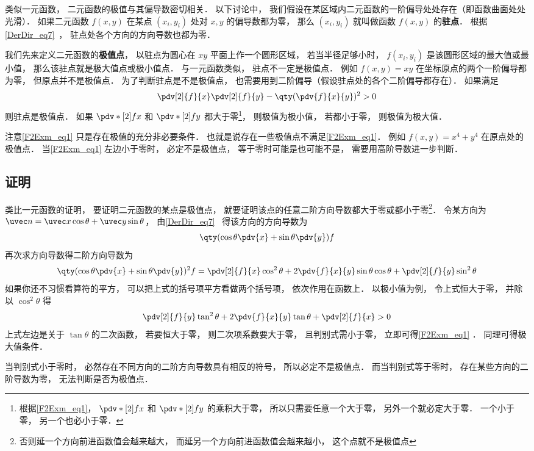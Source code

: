 
类似一元函数， 二元函数的极值与其偏导数密切相关． 以下讨论中， 我们假设在某区域内二元函数的一阶偏导处处存在（即函数曲面处处光滑）． 如果二元函数 $f(x,y)$ 在某点 $(x_i, y_i)$ 处对 $x, y$ 的偏导数都为零， 那么 $(x_i, y_i)$ 就叫做函数 $f(x,y)$ 的\textbf{驻点}． 根据\autoref{DerDir_eq7}~， 驻点处各个方向的方向导数也都为零．

我们先来定义二元函数的\textbf{极值点}， 以驻点为圆心在 $xy$ 平面上作一个圆形区域， 若当半径足够小时， $f(x_i, y_i)$ 是该圆形区域的最大值或最小值， 那么该驻点就是极大值点或极小值点． 与一元函数类似， 驻点不一定是极值点． 例如 $f(x,y) = xy$ 在坐标原点的两个一阶偏导都为零， 但原点并不是极值点． 为了判断驻点是不是极值点， 也需要用到二阶偏导（假设驻点处的各个二阶偏导都存在）． 如果满足
\begin{equation}\label{F2Exm_eq1}
\pdv[2]{f}{x}\pdv[2]{f}{y} - \qty(\pdv{f}{x}{y})^2 > 0
\end{equation}
则驻点是极值点． 如果 $\pdv*[2]{f}{x}$ 和 $\pdv*[2]{f}{y}$ 都大于零\footnote{根据\autoref{F2Exm_eq1}， $\pdv*[2]{f}{x}$ 和 $\pdv*[2]{f}{y}$ 的乘积大于零， 所以只需要任意一个大于零， 另外一个就必定大于零． 一个小于零， 另一个也必小于零．}， 则极值为极小值， 若都小于零， 则极值为极大值．

注意\autoref{F2Exm_eq1} 只是存在极值的充分非必要条件． 也就是说存在一些极值点不满足\autoref{F2Exm_eq1}． 例如 $f(x, y) = x^4 + y^4$ 在原点处的极值点． 当\autoref{F2Exm_eq1} 左边小于零时， 必定不是极值点， 等于零时可能是也可能不是， 需要用高阶导数进一步判断．

\subsection{证明}

类比一元函数的证明， 要证明二元函数的某点是极值点， 就要证明该点的任意二阶方向导数都大于零或都小于零\footnote{否则延一个方向前进函数值会越来越大， 而延另一个方向前进函数值会越来越小， 这个点就不是极值点}． 令某方向为 $\uvec n = \uvec x \cos\theta + \uvec y \sin\theta$， 由\autoref{DerDir_eq7}~ 得该方向的方向导数为
\begin{equation}
\qty(\cos\theta\pdv{x} + \sin\theta\pdv{y}) f
\end{equation}
再次求方向导数得二阶方向导数为
\begin{equation}
\qty(\cos\theta\pdv{x} + \sin\theta\pdv{y})^2 f
= \pdv[2]{f}{x} \cos^2\theta + 2\pdv{f}{x}{y} \sin\theta\cos\theta + \pdv[2]{f}{y} \sin^2\theta
\end{equation}
如果你还不习惯看算符的平方， 可以把上式的括号项平方看做两个括号项， 依次作用在函数上． 以极小值为例， 令上式恒大于零， 并除以 $\cos^2\theta$ 得
\begin{equation}
\pdv[2]{f}{y} \tan^2\theta + 2\pdv{f}{x}{y} \tan\theta + \pdv[2]{f}{x} > 0
\end{equation}
上式左边是关于 $\tan\theta$ 的二次函数， 若要恒大于零， 则二次项系数要大于零， 且判别式需小于零， 立即可得\autoref{F2Exm_eq1} ． 同理可得极大值条件．

当判别式小于零时， 必然存在不同方向的二阶方向导数具有相反的符号， 所以必定不是极值点． 而当判别式等于零时， 存在某些方向的二阶导数为零， 无法判断是否为极值点．
